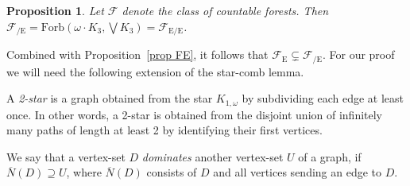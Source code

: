 \documentclass{article}
\newcommand{\forb}[1]{\mathrm{Forb}(#1)}
\newcommand{\frs}{\mathcal{F}}
\newcommand{\frsE}{\frs_\mathrm{E}}
\newcommand{\frsCE}{\frs_\mathrm{{/E}}}
\newcommand{\rmece}[1]{\ensuremath{#1_{\mathrm{E/E}}}}
\newcommand{\omdot}{\omega \cdot}
\newcommand{\defi}[1]{{\color{darkgray}\emph{#1}}}
\newtheorem{proposition}{Proposition}[section]
\newcommand{\cls}[1]{\ensuremath{\overline{#1}}}
\newcommand{\Prr}[1]{Pro\-position~\ref{#1}}
\begin{document}
\begin{proposition} \label{prop FCE}
Let $\frs$ denote the class of countable forests. Then $\frsCE= \forb{\omdot K_3, \bigvee K_3} = \rmece{\frs}$.
\end{proposition}
Combined with \Prr{prop FE}, it follows that $\frsE \subsetneq \frsCE$. For our proof we will need the following extension of the star-comb lemma.

A \defi{2-star} is a graph obtained from the star $K_{1,\omega}$ by subdividing each edge at least once. In other words, a 2-star is obtained from the disjoint union of infinitely many paths of length at least 2 by identifying their first vertices.

We say that a vertex-set $D$ \defi{dominates} another vertex-set $U$ of a graph, if $\cls{N}(D) \supseteq U$, where  $\cls{N}(D)$ consists of $D$ and all vertices sending an edge to $D$.
\end{document}
